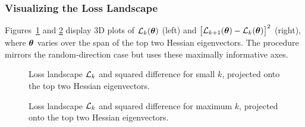 \documentclass{article}
\begin{document}
\subsubsection{Visualizing the Loss Landscape}

Figures~\ref{fig:loss_eigen_small} and \ref{fig:loss_eigen_big} display 3D plots of $\mathcal{L}_k(\boldsymbol{\theta})$ (left) and $\bigl[\mathcal{L}_{k+1}(\boldsymbol{\theta})-\mathcal{L}_k(\boldsymbol{\theta})\bigr]^2$ (right), where $\boldsymbol{\theta}$ varies over the span of the top two Hessian eigenvectors.  The procedure mirrors the random‑direction case but uses these maximally informative axes.

\begin{figure}[!htbp]
  \hspace*{-2.2cm}
  \caption{Loss landscape $\mathcal{L}_k$ and squared difference for small $k$, projected onto the top two Hessian eigenvectors.}
  \label{fig:loss_eigen_small}
\end{figure}

\begin{figure}[!htbp]
  \hspace*{-2.2cm}
  \caption{Loss landscape $\mathcal{L}_k$ and squared difference for maximum $k$, projected onto the top two Hessian eigenvectors.}
  \label{fig:loss_eigen_big}
\end{figure}
\end{document}
